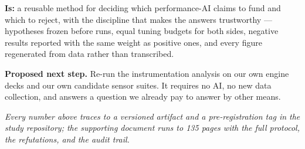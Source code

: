 \documentclass[11pt]{article}
\begin{document}
\textbf{Is:} a reusable method for deciding which performance-AI claims to fund
and which to reject, with the discipline that makes the answers trustworthy ---
hypotheses frozen before runs, equal tuning budgets for both sides, negative
results reported with the same weight as positive ones, and every figure
regenerated from data rather than transcribed.

\textbf{Proposed next step.} Re-run the instrumentation analysis on our own
engine decks and our own candidate sensor suites. It requires no AI, no new data
collection, and answers a question we already pay to answer by other means.

\vfill
{\footnotesize\itshape Every number above traces to a versioned artifact and a
pre-registration tag in the study repository; the supporting document runs to 135
pages with the full protocol, the refutations, and the audit trail.\par}
\end{document}
